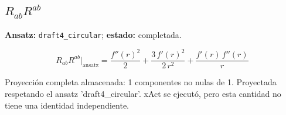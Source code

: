 \documentclass[11pt]{article}
\begin{document}
\subsection*{$ R_{ab}R^{ab} $}
\textbf{Ansatz:} \texttt{draft4\_circular}; \textbf{estado:} completada.\par
\begin{dmath*}[breakdepth={5}]
R_{ab}R^{ab}\big|_{\mathrm{ansatz}} = \frac{{f''\!\left(r\right)}^{2}}{2} + \frac{3\,{f'\!\left(r\right)}^{2}}{2\,{r}^{2}} + \frac{f'\!\left(r\right)\,f''\!\left(r\right)}{r}
\end{dmath*}
\par\smallskip
Proyección completa almacenada: 1 componentes no nulas de 1. Proyectada respetando el ansatz 'draft4\_circular'. xAct se ejecutó, pero esta cantidad no tiene una identidad independiente.\par\medskip
{}
\end{document}
